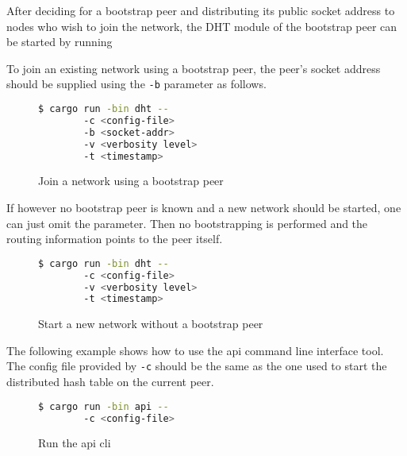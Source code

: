 \documentclass[a4paper, 11pt]{article}
\begin{document}
    After deciding for a bootstrap peer and distributing its public socket address to nodes who wish to join the network, the DHT module of the bootstrap peer can be started by running
    
    To join an existing network using a bootstrap peer, the peer's socket address should be supplied using the \texttt{-b} parameter as follows.
    
    \begin{figure}[H]
    \begin{lstlisting}[language=bash]
    $ cargo run -bin dht -- 
        -c <config-file> 
        -b <socket-addr>
        -v <verbosity level> 
        -t <timestamp>
    \end{lstlisting}
    \caption{Join a network using a bootstrap peer}
    \end{figure}
    
    If however no bootstrap peer is known and a new network should be started, one can just omit the parameter. Then no bootstrapping is performed and the routing information points to the peer itself.
    
    \begin{figure}[H]
    \begin{lstlisting}[language=bash]
    $ cargo run -bin dht -- 
        -c <config-file> 
        -v <verbosity level> 
        -t <timestamp>
    \end{lstlisting}
    \caption{Start a new network without a bootstrap peer}
    \end{figure}
    
    The following example shows how to use the api command line interface tool. The config file provided by \texttt{-c} should be the same as the one used to start the distributed hash table on the current peer.
    
    \begin{figure}[H]
    \begin{lstlisting}[language=bash]
    $ cargo run -bin api -- 
        -c <config-file>
    \end{lstlisting}
    \caption{Run the api cli}
    \end{figure}
    
\end{document}

